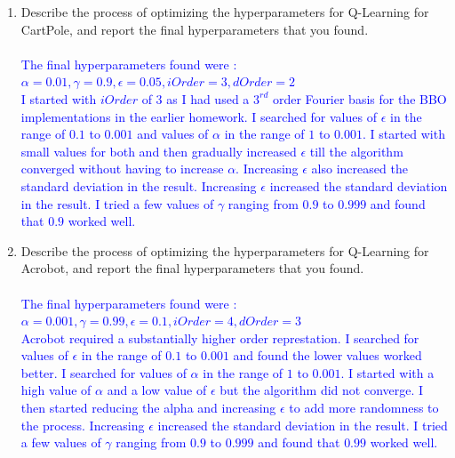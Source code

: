\documentclass[]{article}
\begin{document}
\begin{enumerate}
    \item Describe the process of optimizing the hyperparameters for Q-Learning for CartPole, and report the final hyperparameters that you found.
    \\\\
    \textcolor{blue}{
    	The final hyperparameters found were :\\
    	$
    	\alpha  = 0.01,
    	\gamma = 0.9,
    	\epsilon = 0.05,
    	iOrder = 3,
    	dOrder = 2
    	$\\
    	I started with $iOrder$ of 3 as I had used a $3^{rd}$ order Fourier basis for the BBO implementations in the earlier homework. I searched for values of $\epsilon$ in the range of $0.1$ to $0.001$ and values of $\alpha$ in the range of $1$ to $0.001$.  I started with small values for both and then gradually increased $\epsilon$ till the algorithm converged without having to increase $\alpha$. Increasing $\epsilon$ also increased the standard deviation in the result. Increasing $\epsilon$ increased the standard deviation in the result. I tried a few values of $\gamma$ ranging from $0.9$ to $0.999$ and found that $0.9$ worked well.
    }

    \item Describe the process of optimizing the hyperparameters for Q-Learning for Acrobot, and report the final hyperparameters that you found.
    \\\\
    \textcolor{blue}{
    	The final hyperparameters found were :\\
    	$
    	\alpha  = 0.001,
    	\gamma = 0.99,
    	\epsilon = 0.1,
    	iOrder = 4,
    	dOrder = 3
    	$\\
    	Acrobot required a substantially higher order represtation. I searched for values of $\epsilon$ in the range of $0.1$ to $0.001$ and found the lower values worked better. I searched for values of $\alpha$ in the range of $1$ to $0.001$. I started with a high value of $\alpha$ and a low value of $\epsilon$ but the algorithm did not converge. I then started reducing the alpha and increasing $\epsilon$ to add more randomness to the process. Increasing $\epsilon$ increased the standard deviation in the result. I tried a few values of $\gamma$ ranging from $0.9$ to $0.999$ and found that $0.99$ worked well.
    }


\end{enumerate}
\end{document}
